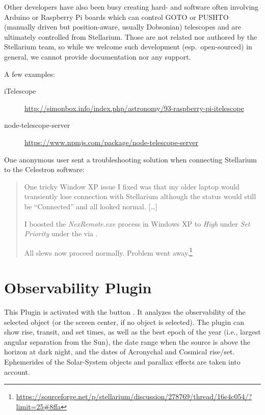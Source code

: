 Other developers have also been busy creating hard- and software often
involving Arduino or Raspberry Pi boards which can control GOTO or
PUSHTO (manually driven but position-aware, usually Dobsonian)
telescopes and are ultimately controlled from Stellarium. Those are
not related nor authored by the Stellarium team, so while we welcome
such development (esp.\ open-sourced) in general, we cannot provide
documentation nor any support.

A few examples:
\begin{description}
\item[iTelescope] \url{http://simonbox.info/index.php/astronomy/93-raspberry-pi-itelescope}
\item[node-telescope-server] \url{https://www.npmjs.com/package/node-telescope-server}
\end{description}

One anonymous user sent a troubleshooting solution when connecting Stellarium to the Celestron  software:
\begin{quote}

  One tricky Window XP issue I fixed was that my older laptop would
  transiently lose connection with Stellarium although the status
  would still be ``Connected'' and all looked normal. [\ldots]


  I boosted the \emph{NexRemote.exe} process in Windows XP to \emph{High} under
  \emph{Set Priority} under the  via
  .

  All slews now proceed normally. Problem went
  away.\footnote{\url{https://sourceforge.net/p/stellarium/discussion/278769/thread/16e4c054/?limit=25\#8ffa}}
\end{quote}


\newpage
\section{Observability Plugin}
\label{sec:plugins:Observability}

This Plugin is activated with the button . 
It analyzes the observability of the selected object (or the
screen center, if no object is selected). The plugin can show rise,
transit, and set times, as well as the best epoch of the year (i.e.,
largest angular separation from the Sun), the date range when the
source is above the horizon at dark night, and the dates of Acronychal
and Cosmical rise/set.  Ephemerides of the Solar-System objects and
parallax effects are taken into account.

